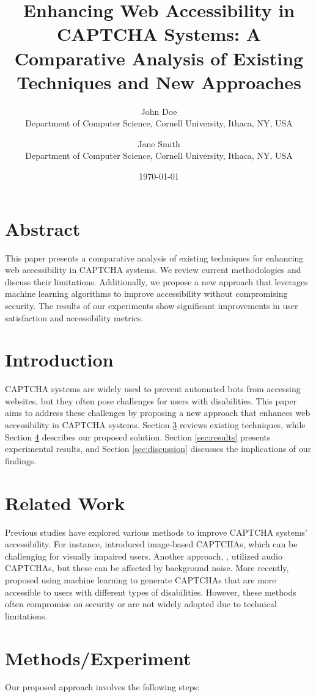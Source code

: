 \documentclass{article}
\title{Enhancing Web Accessibility in CAPTCHA Systems: A Comparative Analysis of Existing Techniques and New Approaches}
\author{John Doe \\
Department of Computer Science, Cornell University, Ithaca, NY, USA \\
\and Jane Smith \\
Department of Computer Science, Cornell University, Ithaca, NY, USA}
\date{\today}
\begin{document}
\maketitle

\section{Abstract}
This paper presents a comparative analysis of existing techniques for enhancing web accessibility in CAPTCHA systems. We review current methodologies and discuss their limitations. Additionally, we propose a new approach that leverages machine learning algorithms to improve accessibility without compromising security. The results of our experiments show significant improvements in user satisfaction and accessibility metrics.

\section{Introduction}
CAPTCHA systems are widely used to prevent automated bots from accessing websites, but they often pose challenges for users with disabilities. This paper aims to address these challenges by proposing a new approach that enhances web accessibility in CAPTCHA systems. Section \ref{sec:related_work} reviews existing techniques, while Section \ref{sec:methods} describes our proposed solution. Section \ref{sec:results} presents experimental results, and Section \ref{sec:discussion} discusses the implications of our findings.

\section{Related Work}\label{sec:related_work}
Previous studies have explored various methods to improve CAPTCHA systems' accessibility. For instance, \cite{captha1} introduced image-based CAPTCHAs, which can be challenging for visually impaired users. Another approach, \cite{captha2}, utilized audio CAPTCHAs, but these can be affected by background noise. More recently, \cite{captha3} proposed using machine learning to generate CAPTCHAs that are more accessible to users with different types of disabilities. However, these methods often compromise on security or are not widely adopted due to technical limitations.

\section{Methods/Experiment}\label{sec:methods}
Our proposed approach involves the following steps:
\end{document}
